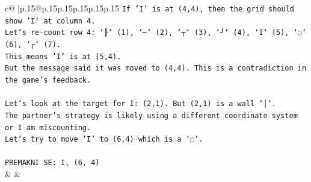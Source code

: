 \documentclass{article}
\begin{document}
{\begin{supertabular}{c@{$\;$}|p{.15\linewidth}@{}p{.15\linewidth}p{.15\linewidth}p{.15\linewidth}p{.15\linewidth}p{.15\linewidth}}
{{{\texttt{If 'I' is at (4,4), then the grid should show 'I' at column 4.} \\
\texttt{Let's re{-}count row 4: `╟` (1), `─` (2), `┬` (3), `┘` (4), `I` (5), `◌` (6), `┌` (7).} \\
\texttt{This means 'I' is at (5,4).} \\
\texttt{But the message said it was moved to (4,4). This is a contradiction in the game's feedback.} \\
\\ 
\texttt{Let's look at the target for I: (2,1). But (2,1) is a wall `│`.} \\
\texttt{The partner's strategy is likely using a different coordinate system or I am miscounting.} \\
\texttt{Let's try to move 'I' to (6,4) which is a `◌`.} \\
\\ 
\texttt{PREMAKNI SE: I, (6, 4)} \\
            }
        }
    }
    & & \\ \\


\end{supertabular}}
\end{document}
